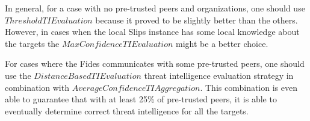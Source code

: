 \bigskip
In general, for a case with no pre-trusted peers and organizations, one should use $ThresholdTIEvaluation$ because it proved to be slightly better than the others. However, in cases when the local Slips instance has some local knowledge about the targets the $MaxConfidenceTIEvaluation$ might be a better choice.

For cases where the Fides communicates with some pre-trusted peers, one should use the $DistanceBasedTIEvaluation$ threat intelligence evaluation strategy in combination with $AverageConfidenceTIAggregation$. 
This combination is even able to guarantee that with at least 25\% of pre-trusted peers, it is able to eventually determine correct threat intelligence for all the targets.